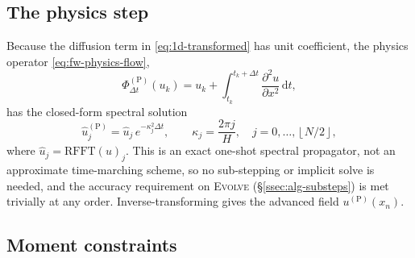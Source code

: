 \documentclass{article}
\begin{document}
\subsection{The physics step}\label{ssec:1d-physics-step}

Because the diffusion term in \eqref{eq:1d-transformed} has unit coefficient,
the physics operator \eqref{eq:fw-physics-flow},
\begin{equation}\label{eq:1d-physics-flow}
  \Phi_{\Delta t}^{(\mathrm{P})}(u_k)
  = u_k + \int_{t_k}^{t_k + \Delta t} \frac{\partial^2 u}{\partial x^2}\, \mathrm{d}t,
\end{equation}
has the closed-form spectral solution
\begin{equation}\label{eq:1d-propagator}
  \hat u_j^{(\mathrm{P})} = \hat u_j\, e^{-\kappa_j^2 \Delta t},
  \qquad \kappa_j = \frac{2\pi j}{H}, \quad j = 0, \dots, \left\lfloor N/2 \right\rfloor,
\end{equation}
where $\hat u_j = \mathrm{RFFT}(u)_j$. This is an exact one-shot spectral
propagator, not an approximate time-marching scheme, so no sub-stepping or
implicit solve is needed, and the accuracy requirement on \textsc{Evolve}
(\S\ref{ssec:alg-substeps}) is met trivially at any order. Inverse-transforming
gives the advanced field $u^{(\mathrm{P})}(x_n)$.

\subsection{Moment constraints}\label{ssec:1d-moments}
\end{document}
